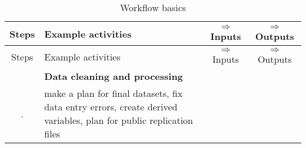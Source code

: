 \documentclass[
]{book}
\begin{document}
\begin{longtable}[]{@{}clcc@{}}
\caption{\label{tab:workflow} Workflow basics}\tabularnewline
\toprule
\begin{minipage}[b]{0.07\columnwidth}\centering
Steps\strut
\end{minipage} & \begin{minipage}[b]{0.25\columnwidth}\raggedright
Example activities\strut
\end{minipage} & \begin{minipage}[b]{0.28\columnwidth}\centering
\(\Rightarrow\) Inputs\strut
\end{minipage} & \begin{minipage}[b]{0.29\columnwidth}\centering
\(\Rightarrow\) Outputs\strut
\end{minipage}\tabularnewline
\midrule
\endfirsthead
\toprule
\begin{minipage}[b]{0.07\columnwidth}\centering
Steps\strut
\end{minipage} & \begin{minipage}[b]{0.25\columnwidth}\raggedright
Example activities\strut
\end{minipage} & \begin{minipage}[b]{0.28\columnwidth}\centering
\(\Rightarrow\) Inputs\strut
\end{minipage} & \begin{minipage}[b]{0.29\columnwidth}\centering
\(\Rightarrow\) Outputs\strut
\end{minipage}\tabularnewline
\midrule
\endhead
\begin{minipage}[t]{0.07\columnwidth}\centering
1\strut
\end{minipage} & \begin{minipage}[t]{0.25\columnwidth}\raggedright
\textbf{Data cleaning and processing}\strut
\end{minipage} & \begin{minipage}[t]{0.28\columnwidth}\centering
\strut
\end{minipage} & \begin{minipage}[t]{0.29\columnwidth}\centering
\strut
\end{minipage}\tabularnewline
\begin{minipage}[t]{0.07\columnwidth}\centering
.\strut
\end{minipage} & \begin{minipage}[t]{0.25\columnwidth}\raggedright
make a plan for final datasets, fix data entry errors, create derived variables, plan for public replication files\strut

\end{minipage}
\end{longtable}
\end{document}
